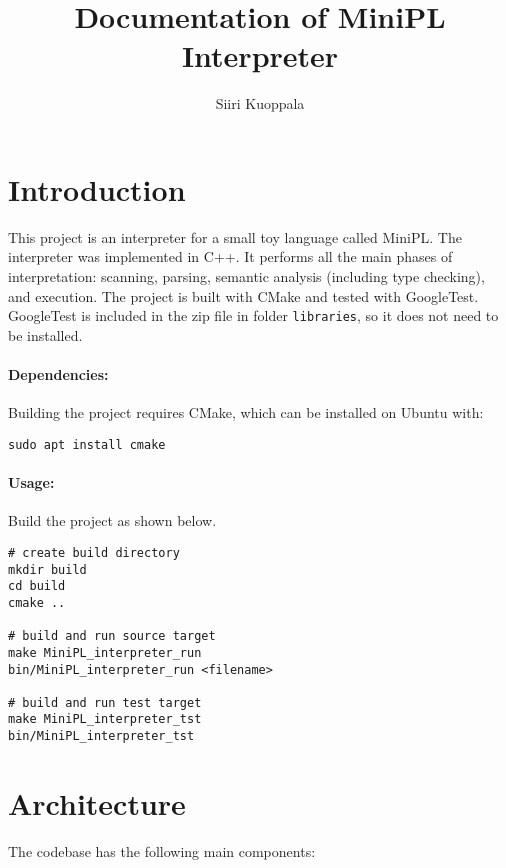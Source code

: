 \documentclass[a4paper]{article}
\newcommand*{\code}[1]{\texttt{#1}}
\begin{document}
\begin{titlepage}
  \title{Documentation of MiniPL Interpreter}
  \author{Siiri Kuoppala}
  \maketitle
  \tableofcontents
\end{titlepage}


\section{Introduction}
This project is an interpreter for a small toy language
called MiniPL. The interpreter was implemented in C++.
It performs all the main phases of interpretation: 
scanning, parsing, semantic analysis (including type checking), 
and execution. The project is built with CMake and tested 
with GoogleTest. GoogleTest is included in the zip file in 
folder \code{libraries}, so it does not need to be installed.

\paragraph*{Dependencies:} Building the project requires CMake, 
which can be installed on Ubuntu with: 
\begin{verbatim}
sudo apt install cmake
\end{verbatim}

\paragraph*{Usage:} Build the project as shown below.

\begin{verbatim}
# create build directory
mkdir build
cd build
cmake ..

# build and run source target
make MiniPL_interpreter_run
bin/MiniPL_interpreter_run <filename>

# build and run test target
make MiniPL_interpreter_tst
bin/MiniPL_interpreter_tst
\end{verbatim}

\section{Architecture}


The codebase has the following main components:
\end{document}
